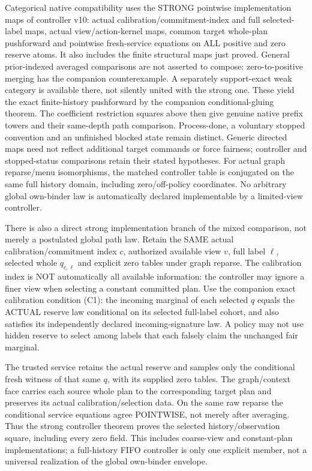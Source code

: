 \documentclass[11pt]{article}\usepackage{amsmath,amssymb,amsthm}
\begin{document}
Categorical native compatibility uses the STRONG pointwise implementation maps of controller v10: actual calibration/commitment-index and full selected-label maps, actual view/action-kernel maps, common target whole-plan pushforward and pointwise fresh-service equations on ALL positive and zero reserve atoms. It also includes the finite structural maps just proved. General prior-indexed averaged comparisons are not asserted to compose: zero-to-positive merging has the companion counterexample. A separately support-exact weak category is available there, not silently united with the strong one. These yield the exact finite-history pushforward by the companion conditional-gluing theorem. The coefficient restriction squares above then give genuine native prefix towers and their same-depth path comparison. Process-done, a voluntary stopped convention and an unfinished blocked state remain distinct. Generic directed maps need not reflect additional target commands or force fairness; controller and stopped-status comparisons retain their stated hypotheses. For actual graph reparse/menu isomorphisms, the matched controller table is conjugated on the same full history domain, including zero/off-policy coordinates. No arbitrary global own-binder law is automatically declared implementable by a limited-view controller.

There is also a direct strong implementation branch of the mixed comparison, not merely a postulated global path law. Retain the SAME actual calibration/commitment index $c$, authorized available view $v$, full label $\ell$, selected whole $q_{c,\ell}$ and explicit zero tables under graph reparse. The calibration index is NOT automatically all available information: the controller may ignore a finer view when selecting a constant committed plan. Use the companion exact calibration condition (C1): the incoming marginal of each selected $q$ equals the ACTUAL reserve law conditional on its selected full-label cohort, and also satisfies its independently declared incoming-signature law. A policy may not use hidden reserve to select among labels that each falsely claim the unchanged fair marginal.

The trusted service retains the actual reserve and samples only the conditional fresh witness of that same $q$, with its supplied zero tables. The graph/context face carries each source whole plan to the corresponding target plan and preserves its actual calibration/selection data. On the same raw reparse the conditional service equations agree POINTWISE, not merely after averaging. Thus the strong controller theorem proves the selected history/observation square, including every zero field. This includes coarse-view and constant-plan implementations; a full-history FIFO controller is only one explicit member, not a universal realization of the global own-binder envelope.
\end{document}
